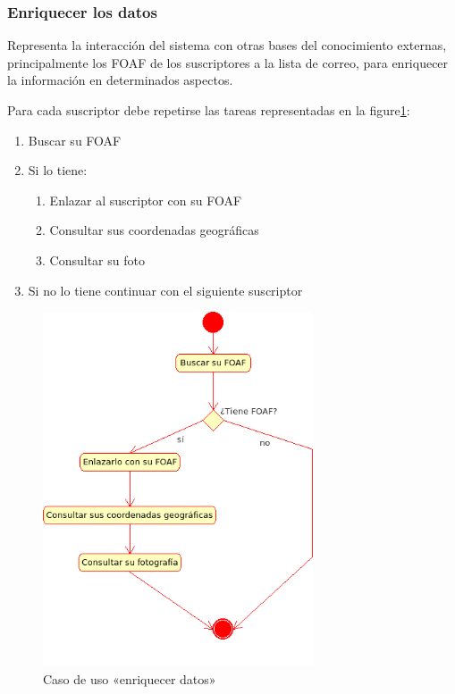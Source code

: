 \subsubsection{Enriquecer los datos}

Representa la interacción del sistema con otras bases del conocimiento externas, 
principalmente los FOAF de los suscriptores a la lista de correo, para enriquecer 
la información en determinados aspectos.

Para cada suscriptor debe repetirse las tareas representadas en la 
figure\ref{fig:uml:enriquecer}:

\begin{enumerate}
  \item Buscar su FOAF
  \item Si lo tiene:
	\begin{enumerate}
	  \item	Enlazar al suscriptor con su FOAF
	  \item Consultar sus coordenadas geográficas
	  \item Consultar su foto
	\end{enumerate}
  \item Si no lo tiene continuar con el siguiente suscriptor
\end{enumerate}

\begin{figure}[ht]
 	\centering
	\includegraphics[width=8cm]{images/uml/casos-uso/enriquecer.png}
	\caption{Caso de uso «enriquecer datos»}
	\label{fig:uml:enriquecer}
\end{figure}

